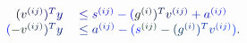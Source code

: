 \documentclass[12pt]{article}
\begin{document}
\makeatletter
\renewcommand*{\@textcolor}[3]{%
  \protect\leavevmode
  \begingroup
    \color#1{#2}#3%
  \endgroup
}
\makeatother
\begin{displaymath}
\begin{array} {rl} { \mathcolor[RGB]{0,0,15}{(} \mathcolor[RGB]{0,0,30}{v} ^ { \mathcolor[RGB]{0,0,45}{(} \mathcolor[RGB]{0,0,60}{i} \mathcolor[RGB]{0,0,75}{j} \mathcolor[RGB]{0,0,90}{)} } \mathcolor[RGB]{0,0,105}{)} ^ { \mathcolor[RGB]{0,0,120}{T} } \mathcolor[RGB]{0,0,135}{y} } & { { } \mathcolor[RGB]{0,0,150}{\leq} \mathcolor[RGB]{0,0,165}{s} ^ { \mathcolor[RGB]{0,0,180}{(} \mathcolor[RGB]{0,0,195}{i} \mathcolor[RGB]{0,0,210}{j} \mathcolor[RGB]{0,0,225}{)} } \mathcolor[RGB]{0,0,240}{-} \mathcolor[RGB]{0,0,255}{(} \mathcolor[RGB]{0,15,0}{g} ^ { \mathcolor[RGB]{0,15,15}{(} \mathcolor[RGB]{0,15,30}{i} \mathcolor[RGB]{0,15,45}{)} } \mathcolor[RGB]{0,15,60}{)} ^ { \mathcolor[RGB]{0,15,75}{T} } \mathcolor[RGB]{0,15,90}{v} ^ { \mathcolor[RGB]{0,15,105}{(} \mathcolor[RGB]{0,15,120}{i} \mathcolor[RGB]{0,15,135}{j} \mathcolor[RGB]{0,15,150}{)} } \mathcolor[RGB]{0,15,165}{+} \mathcolor[RGB]{0,15,180}{a} ^ { \mathcolor[RGB]{0,15,195}{(} \mathcolor[RGB]{0,15,210}{i} \mathcolor[RGB]{0,15,225}{j} \mathcolor[RGB]{0,15,240}{)} } } \\ { \mathcolor[RGB]{0,15,255}{(} \mathcolor[RGB]{0,30,0}{-} \mathcolor[RGB]{0,30,15}{v} ^ { \mathcolor[RGB]{0,30,30}{(} \mathcolor[RGB]{0,30,45}{i} \mathcolor[RGB]{0,30,60}{j} \mathcolor[RGB]{0,30,75}{)} } \mathcolor[RGB]{0,30,90}{)} ^ { \mathcolor[RGB]{0,30,105}{T} } \mathcolor[RGB]{0,30,120}{y} } & { { } \mathcolor[RGB]{0,30,135}{\leq} \mathcolor[RGB]{0,30,150}{a} ^ { \mathcolor[RGB]{0,30,165}{(} \mathcolor[RGB]{0,30,180}{i} \mathcolor[RGB]{0,30,195}{j} \mathcolor[RGB]{0,30,210}{)} } \mathcolor[RGB]{0,30,225}{-} \mathcolor[RGB]{0,30,240}{(} \mathcolor[RGB]{0,30,255}{s} ^ { \mathcolor[RGB]{0,45,0}{(} \mathcolor[RGB]{0,45,15}{i} \mathcolor[RGB]{0,45,30}{j} \mathcolor[RGB]{0,45,45}{)} } \mathcolor[RGB]{0,45,60}{-} \mathcolor[RGB]{0,45,75}{(} \mathcolor[RGB]{0,45,90}{g} ^ { \mathcolor[RGB]{0,45,105}{(} \mathcolor[RGB]{0,45,120}{i} \mathcolor[RGB]{0,45,135}{)} } \mathcolor[RGB]{0,45,150}{)} ^ { \mathcolor[RGB]{0,45,165}{T} } \mathcolor[RGB]{0,45,180}{v} ^ { \mathcolor[RGB]{0,45,195}{(} \mathcolor[RGB]{0,45,210}{i} \mathcolor[RGB]{0,45,225}{j} \mathcolor[RGB]{0,45,240}{)} } \mathcolor[RGB]{0,45,255}{)} \mathcolor[RGB]{0,60,0}{.} } \end{array}
\end{displaymath}
\end{document}

